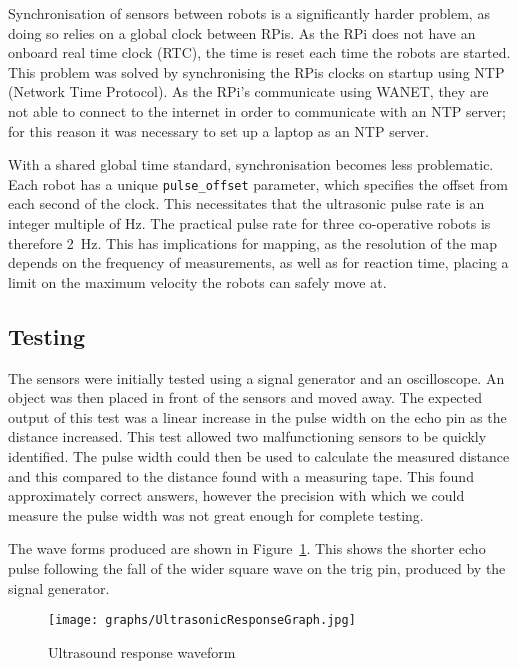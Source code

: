 Synchronisation of sensors between robots is a significantly harder problem, as
doing so relies on a global clock between RPis. As the RPi does not have an
onboard real time clock (RTC), the time is reset each time the robots are started.
This problem was solved by synchronising the RPis clocks on startup using NTP
(Network Time Protocol). As the RPi's communicate using WANET, they are not able
to connect to the internet in order to communicate with an NTP server; for this
reason it was necessary to set up a laptop as an NTP server.

With a shared global time standard, synchronisation becomes less problematic.
Each robot has a unique \verb|pulse_offset| parameter, which specifies the offset
from each second of the clock. This necessitates that the ultrasonic pulse rate
is an integer multiple of \si{\hertz}. The practical pulse rate for three
co-operative robots is therefore \SI{2}{\hertz}. This has implications for mapping,
as the resolution of the map depends on the frequency of measurements, as well as
for reaction time, placing a limit on the maximum velocity the robots can safely
move at.


\subsection{Testing}\label{elec/range/test}
The sensors were initially tested using a signal generator and an
oscilloscope. An object was then placed in front of the sensors
and moved away. The expected output of this test was a linear increase
in the pulse width on the echo pin as the distance
increased. This test allowed two malfunctioning sensors to be quickly identified. The pulse width could then be used to
calculate the measured distance and this compared to the distance
found with a measuring tape. This found approximately correct answers,
however the precision with which we could measure the pulse width was
not great enough for complete testing.

The wave forms produced are shown in Figure~\ref{UltrasoundWaveform}. This shows the shorter echo pulse following the fall of the wider
square wave on the trig pin, produced by the signal generator.

\begin{figure}[!ht]
	\centering
	\texttt{[image: graphs/UltrasonicResponseGraph.jpg]}
	\caption{Ultrasound response waveform}\label{UltrasoundWaveform}

\end{figure}

